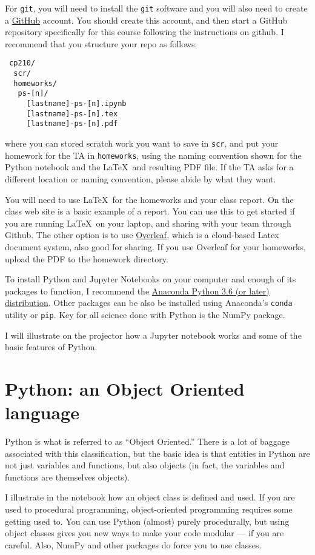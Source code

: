 For {\tt git}, you will need to install the {\tt git} software and you
will also need to create a \href{http://github.com}{\color{red}
  GitHub} account. You should create this account, and then start a
GitHub repository specifically for this course following the
instructions on github. I recommend that you structure your repo as
follows:
\begin{verbatim}
 cp210/
  scr/
  homeworks/
   ps-[n]/
     [lastname]-ps-[n].ipynb
     [lastname]-ps-[n].tex
     [lastname]-ps-[n].pdf
\end{verbatim}
where you can stored scratch work you want to save in {\tt scr}, and
put your homework for the TA in {\tt homeworks}, using the naming
convention shown for the Python notebook and the \LaTeX\ and resulting
PDF file. If the TA asks for a different location or naming
convention, please abide by what they want.

You will need to use \LaTeX\ for the homeworks and your class
report. On the class web site is a basic example of a report. You can
use this to get started if you are running \LaTeX\ on your laptop, and
sharing with your team through Github. The other option is to use
\href{http://overleaf.com}{\color{red} Overleaf}, which is a
cloud-based Latex document system, also good for sharing. If you use
Overleaf for your homeworks, upload the PDF to the homework directory.

To install Python and Jupyter Notebooks on your computer and enough of
its packages to function, I recommend the
\href{https://www.continuum.io/downloads}{\color{red} Anaconda Python
  3.6 (or later) distribution}. Other packages can be also be
installed using Anaconda's {\tt conda} utility or {\tt pip}. Key for
all science done with Python is the NumPy package.

I will illustrate on the projector how a Jupyter notebook works and
some of the basic features of Python.

\section{Python: an Object Oriented language}

Python is what is referred to as ``Object Oriented.'' There is a lot
of baggage associated with this classification, but the basic idea is
that entities in Python are not just variables and functions, but also
objects (in fact, the variables and functions are themselves
objects). 

I illustrate in the notebook how an object class is defined and
used. If you are used to procedural programming, object-oriented
programming requires some getting used to. You can use Python (almost)
purely procedurally, but using object classes gives you new ways to
make your code modular --- if you are careful. Also, NumPy and other
packages do force you to use classes. 

